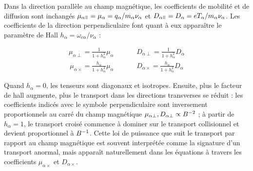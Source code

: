 \begin{refsection}
Dans la direction parallèle au champ magnétique, les coefficients de mobilité et
de diffusion sont inchangés
$\mu_{\alpha\para}=\mu_{\alpha}=q_\alpha/m_\alpha\nu_\alpha$ et
$D_{\alpha\para}=D_\alpha=eT_\alpha/m_\alpha\nu_\alpha$. Les coefficients de la
direction perpendiculaire font quant à eux apparaître le paramètre de Hall
$h_\alpha=\omega_{c\alpha}/\nu_\alpha$ :

\begin{align}
\mu_{\alpha\perp}=\frac{1}{1+h_\alpha^2}\mu_\alpha\;\;\;\;\;\;\;\;
\;\;\;\;D_{\alpha\perp}=\frac{1}{1+h_\alpha^2}D_\alpha
\end{align}
\begin{align}
\mu_{\alpha\times}=\frac{h_\alpha}{1+h_\alpha^2}\mu_\alpha\;\;\;\;
\;\;\;\;\;\;\;\;D_{\alpha\times}=\frac{h_\alpha}{1+h_\alpha^2}D_\alpha
\end{align}

Quand $h_\alpha=0$, les tenseurs sont diagonaux et isotropes. Ensuite, plus le
facteur de hall augmente, plus le transport dans les directions transverses se
réduit :
les coefficients indicés avec le symbole perpendiculaire sont inversement
proportionnels au carré du champ magnétique $\mu_{\alpha\perp},
D_{\alpha\perp}\propto B^{{-2}}$ ; à partir de $h_\alpha=1$, le
transport croisé commence à dominer sur le transport collisionnel et devient proportionnel à
$B^{{-1}}$. Cette loi de puissance que suit le transport par rapport au
champ magnétique est souvent interprétée comme la signature d'un transport
anormal, mais apparaît naturellement dans les équations à travers les
coefficients $\mu_{\alpha\times}$ et $D_{\alpha\times}$.



%
%
\end{refsection}

